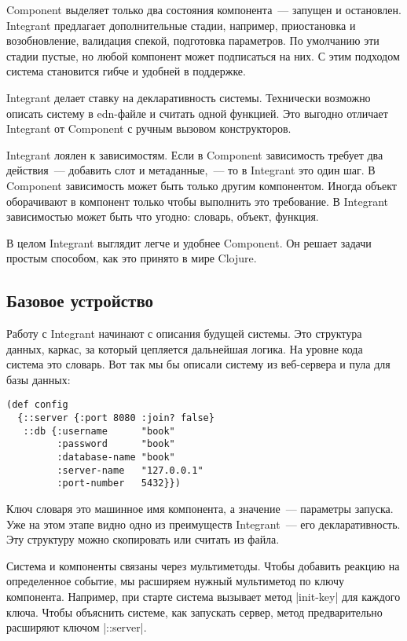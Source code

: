 Component выделяет только два состояния компонента~--- запущен и
остановлен. Integrant предлагает дополнительные стадии, например, приостановка и
возобновление, валидация спекой, подготовка параметров. По умолчанию эти стадии
пустые, но любой компонент может подписаться на них. С этим подходом система
становится гибче и удобней в поддержке.

Integrant делает ставку на декларативность системы. Технически возможно описать
систему в edn-файле и считать одной функцией. Это выгодно отличает Integrant от
Component с ручным вызовом конструкторов.

Integrant лоялен к зависимостям. Если в Component зависимость требует два
действия~--- добавить слот и метаданные,~--- то в Integrant это один шаг. В
Component зависимость может быть только другим компонентом. Иногда объект
оборачивают в компонент только чтобы выполнить это требование. В Integrant
зависимостью может быть что угодно: словарь, объект, функция.

В целом Integrant выглядит легче и удобнее Component. Он решает задачи простым
способом, как это принято в мире Clojure.

\subsection{Базовое устройство}

Работу с Integrant начинают с описания будущей системы. Это структура данных,
каркас, за который цепляется дальнейшая логика. На уровне кода система это
словарь. Вот так мы бы описали систему из веб-сервера и пула для базы данных:

\begin{verbatim}
(def config
  {::server {:port 8080 :join? false}
   ::db {:username      "book"
         :password      "book"
         :database-name "book"
         :server-name   "127.0.0.1"
         :port-number   5432}})
\end{verbatim}

Ключ словаря это машинное имя компонента, а значение~--- параметры запуска. Уже на
этом этапе видно одно из преимуществ Integrant~--- его декларативность. Эту
структуру можно скопировать или считать из файла.

Система и компоненты связаны через мультиметоды. Чтобы добавить реакцию на
определенное событие, мы расширяем нужный мультиметод по ключу
компонента. Например, при старте система вызывает метод \spverb|init-key| для каждого
ключа. Чтобы объяснить системе, как запускать сервер, метод предварительно
расширяют ключом \spverb|::server|.

